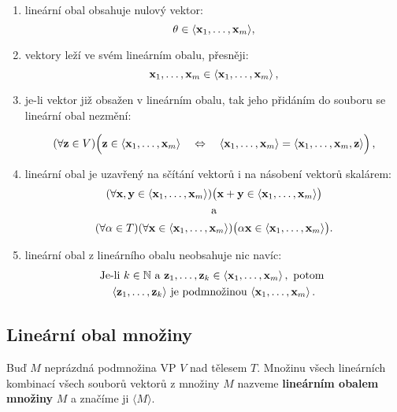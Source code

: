 \begin{enumerate}
      \item lineární obal obsahuje nulový vektor:
            \[ \theta\in \langle \mathbf{x}_1,\ldots,\mathbf{x}_m \rangle , \]
      \item vektory leží ve svém lineárním obalu, přesněji:
            \[ \mathbf{x}_1,\ldots,\mathbf{x}_m  \in  \langle \mathbf{x}_1,\ldots,\mathbf{x}_m \rangle\,, \]
      \item je-li vektor již obsažen v lineárním obalu, tak jeho přidáním do souboru se
            lineární obal nezmění:

            \[ (\forall \mathbf{z}\in V)\Big(\mathbf{z}\in\langle \mathbf{x}_1,\ldots,\mathbf{x}_m \rangle   \quad \Leftrightarrow \quad \langle  \mathbf{x}_1,\ldots,\mathbf{x}_m  \rangle =\langle  \mathbf{x}_1,\ldots,\mathbf{x}_m,\mathbf{z}  \rangle\Big)\,, \]

      \item lineární obal je uzavřený na sčítání vektorů i na násobení vektorů skalárem:
            \begin{gather*}
                  (\forall\mathbf{x},\mathbf{y}\in\langle  \mathbf{x}_1,\ldots,\mathbf{x}_m \rangle)\big(\mathbf{x}+\mathbf{y}\in\langle \mathbf{x}_1,\ldots,\mathbf{x}_m \rangle\big)\\
                  \quad\text{a}\quad\\
                  (\forall\alpha\in T)(\forall\mathbf{x}\in\langle \mathbf{x}_1,\ldots,\mathbf{x}_m \rangle)\big(\alpha \mathbf{x}\in\langle \mathbf{x}_1,\ldots,\mathbf{x}_m \rangle\big) .
            \end{gather*}
      \item lineární obal z lineárního obalu neobsahuje nic navíc:
            \begin{gather*}
                  \text{Je-li } k\in \mathbb{N} \text{ a } \mathbf{z}_1,\dots, \mathbf{z}_k\in\langle  \mathbf{x}_1,\ldots,\mathbf{x}_m \rangle\,,\text{ potom }\\
                  \langle  \mathbf{z}_1,\ldots,\mathbf{z}_k  \rangle \text{ je podmnožinou } \langle  \mathbf{x}_1,\ldots,\mathbf{x}_m \rangle\,.
            \end{gather*}
\end{enumerate}

\subsection*{Lineární obal množiny}

Buď $M$ neprázdná podmnožina VP $V$ nad tělesem $T$. Množinu všech lineárních
kombinací všech souborů vektorů z množiny $M$ nazveme \textbf{lineárním obalem
      množiny} $M$ a značíme ji $\langle M \rangle $.

